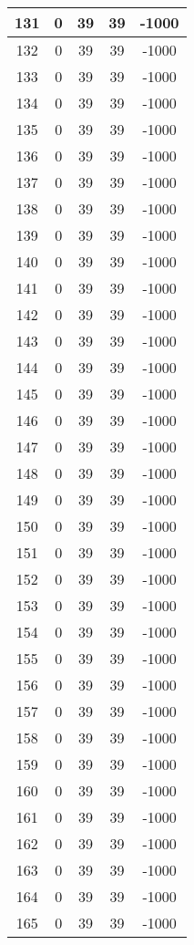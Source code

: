 \documentclass[letterpaper, 12pt]{article}
\begin{document}
\begin{longtable}{|c|c|c|c|c|}
\hline
131 & 0 & 39 & 39 & -1000 \\
\hline
132 & 0 & 39 & 39 & -1000 \\
\hline
133 & 0 & 39 & 39 & -1000 \\
\hline
134 & 0 & 39 & 39 & -1000 \\
\hline
135 & 0 & 39 & 39 & -1000 \\
\hline
136 & 0 & 39 & 39 & -1000 \\
\hline
137 & 0 & 39 & 39 & -1000 \\
\hline
138 & 0 & 39 & 39 & -1000 \\
\hline
139 & 0 & 39 & 39 & -1000 \\
\hline
140 & 0 & 39 & 39 & -1000 \\
\hline
141 & 0 & 39 & 39 & -1000 \\
\hline
142 & 0 & 39 & 39 & -1000 \\
\hline
143 & 0 & 39 & 39 & -1000 \\
\hline
144 & 0 & 39 & 39 & -1000 \\
\hline
145 & 0 & 39 & 39 & -1000 \\
\hline
146 & 0 & 39 & 39 & -1000 \\
\hline
147 & 0 & 39 & 39 & -1000 \\
\hline
148 & 0 & 39 & 39 & -1000 \\
\hline
149 & 0 & 39 & 39 & -1000 \\
\hline
150 & 0 & 39 & 39 & -1000 \\
\hline
151 & 0 & 39 & 39 & -1000 \\
\hline
152 & 0 & 39 & 39 & -1000 \\
\hline
153 & 0 & 39 & 39 & -1000 \\
\hline
154 & 0 & 39 & 39 & -1000 \\
\hline
155 & 0 & 39 & 39 & -1000 \\
\hline
156 & 0 & 39 & 39 & -1000 \\
\hline
157 & 0 & 39 & 39 & -1000 \\
\hline
158 & 0 & 39 & 39 & -1000 \\
\hline
159 & 0 & 39 & 39 & -1000 \\
\hline
160 & 0 & 39 & 39 & -1000 \\
\hline
161 & 0 & 39 & 39 & -1000 \\
\hline
162 & 0 & 39 & 39 & -1000 \\
\hline
163 & 0 & 39 & 39 & -1000 \\
\hline
164 & 0 & 39 & 39 & -1000 \\
\hline
165 & 0 & 39 & 39 & -1000 \\

\end{longtable}
\end{document}
